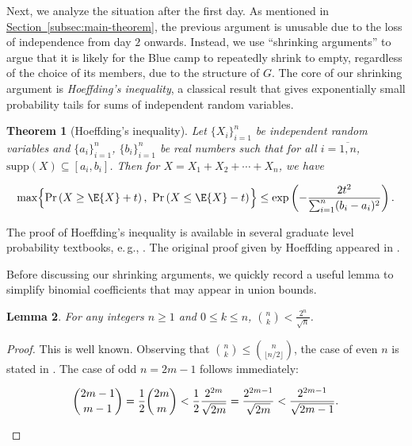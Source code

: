 \documentclass[11pt]{article}
\numberwithin{equation}{section}
\newtheorem{theorem}{Theorem}[section]
\newtheorem{lemma}[theorem]{Lemma}
\theoremstyle{definition}
\theoremstyle{plain}
\newcommand{\eg}{e.\,g.}
\newcommand{\expref}[2]{\hyperref[#2]{#1~\ref{#2}}}
\begin{document}
			\noindent Next, we analyze the situation after the first day.
			As mentioned in \expref{Section}{subsec:main-theorem}, the previous %
			argument  %
			is unusable due to the loss of independence from day $2$ onwards.
			Instead, we use ``shrinking arguments'' to argue that it is likely for the Blue camp to repeatedly shrink to empty, regardless of the choice of its members, due to %
			the structure of $G$.  %
			The core of our shrinking argument is \emph{Hoeffding's inequality}, a classical result that gives exponentially small probability tails for sums of independent random variables.
			\begin{theorem}[Hoeffding's inequality]  \label{thm:hoeffding}
				Let $\{X_i\}_{i=1}^n$ be independent random variables and $\{a_i\}_{i=1}^n$, $\{b_i\}_{i=1}^n$ be real numbers such that for all $i=\overline{1, n}$, $\text{supp}(X)\subseteq [a_i, b_i]$. Then for $X = X_1+X_2+\cdots + X_n$, we have
				\begin{linenomath}\begin{equation*}
						\max \Bigl\{\Pr\left( X \ge \E{X} + t \right),\ \Pr\left( X \le \E{X} -t \right)^{} \Bigr\} \le \exp\left(-\frac{2t^2}{\sum_{i=1}^n (b_i - a_i)^2}\right).
				\end{equation*}\end{linenomath}
			\end{theorem}
			The proof of Hoeffding's inequality is 
			available in %
			several  %
			graduate level probability textbooks, \eg, \cite{vershynin2018}. The original proof given by Hoeffding appeared in \cite{hoeffding1963}.
			
			Before discussing our shrinking arguments, we quickly record a useful
			lemma to simplify binomial coefficients that may appear in union bounds.
			\begin{lemma}  \label{lem:binom-bound}
				For any integers $n\ge 1$ and $0\le k\le n$, $\displaystyle \binom{n}{k} < \frac{2^n}{\sqrt{n}}$.
			\end{lemma}
			\begin{proof}
				This is well known.  Observing that $\binom{n}{k}\le \binom{n}{\lfloor n/2\rfloor}$,
				the case of even $n$ is stated in \cite[2.6.2 Proposition]{invitation}.  The case of
				odd $n=2m-1$ follows immediately:
				\begin{linenomath}\begin{equation*}
						\binom{2m - 1}{m - 1} = \frac{1}{2} \binom{2m}{m} < \frac{1}{2} \frac{2^{2m}}{\sqrt{2m}}
						= \frac{2^{2m - 1}}{\sqrt{2m}} < \frac{2^{2m - 1}}{\sqrt{2m - 1}}.  \qedhere
				\end{equation*}\end{linenomath}
			\end{proof}
			
\end{document}
